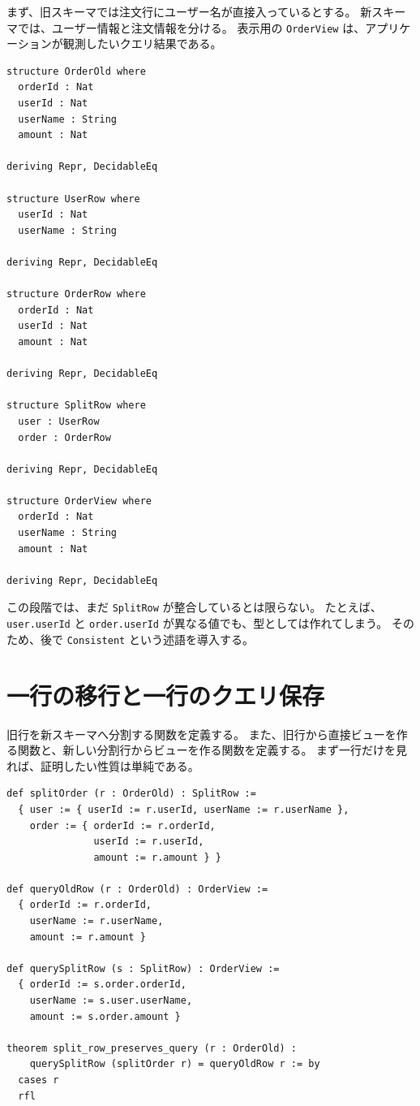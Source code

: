 まず、旧スキーマでは注文行にユーザー名が直接入っているとする。
新スキーマでは、ユーザー情報と注文情報を分ける。
表示用の \texttt{OrderView} は、アプリケーションが観測したいクエリ結果である。

\begin{listing}[htbp]
\begin{verbatim}
structure OrderOld where
  orderId : Nat
  userId : Nat
  userName : String
  amount : Nat

deriving Repr, DecidableEq

structure UserRow where
  userId : Nat
  userName : String

deriving Repr, DecidableEq

structure OrderRow where
  orderId : Nat
  userId : Nat
  amount : Nat

deriving Repr, DecidableEq

structure SplitRow where
  user : UserRow
  order : OrderRow

deriving Repr, DecidableEq

structure OrderView where
  orderId : Nat
  userName : String
  amount : Nat

deriving Repr, DecidableEq
\end{verbatim}
\caption{旧スキーマ、新スキーマ、表示用ビュー}
\label{lst:ch26-schema-model}
\end{listing}

この段階では、まだ \texttt{SplitRow} が整合しているとは限らない。
たとえば、\texttt{user.userId} と \texttt{order.userId} が異なる値でも、型としては作れてしまう。
そのため、後で \texttt{Consistent} という述語を導入する。

\section{一行の移行と一行のクエリ保存}

旧行を新スキーマへ分割する関数を定義する。
また、旧行から直接ビューを作る関数と、新しい分割行からビューを作る関数を定義する。
まず一行だけを見れば、証明したい性質は単純である。

\begin{listing}[htbp]
\begin{verbatim}
def splitOrder (r : OrderOld) : SplitRow :=
  { user := { userId := r.userId, userName := r.userName },
    order := { orderId := r.orderId,
               userId := r.userId,
               amount := r.amount } }

def queryOldRow (r : OrderOld) : OrderView :=
  { orderId := r.orderId,
    userName := r.userName,
    amount := r.amount }

def querySplitRow (s : SplitRow) : OrderView :=
  { orderId := s.order.orderId,
    userName := s.user.userName,
    amount := s.order.amount }

theorem split_row_preserves_query (r : OrderOld) :
    querySplitRow (splitOrder r) = queryOldRow r := by
  cases r
  rfl
\end{verbatim}
\caption{一行の移行とクエリ保存}
\label{lst:ch26-row-preservation}
\end{listing}

